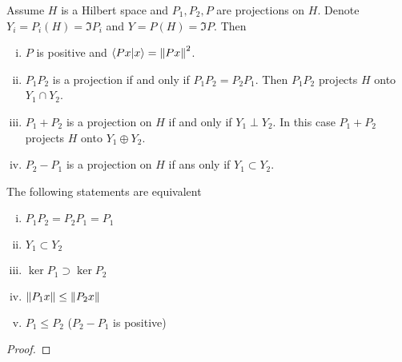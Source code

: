 \documentclass[../../script.tex]{subfiles}
\begin{document}
\begin{defi}
    Assume $H$ is a Hilbert space and $P_1, P_2, P$ are projections on $H$. Denote $Y_i = P_i(H) = \Im P_i$ and $Y = P(H) = \Im P$. Then 
    \begin{enumerate}[(i)]
        \item $P$ is positive and $\innerproduct{Px}{x} = \norm{Px}^2$.
        \item $P_1 P_2$ is a projection if and only if $P_1 P_2 = P_2 P_1$. Then $P_1 P_2$ projects $H$ onto $Y_1 \cap Y_2$.
        \item $P_1 + P_2$ is a projection on $H$ if and only if $Y_1 \perp Y_2$. In this case $P_1 + P_2$ projects $H$ onto $Y_1 \oplus Y_2$.
        \item $P_2 - P_1$ is a projection on $H$ if ans only if $Y_1 \subset Y_2$.
    \end{enumerate}
\end{defi}

\begin{thm}
    The following statements are equivalent
    \begin{enumerate}[(i)]
        \item $P_1 P_2 = P_2 P_1 = P_1$
        \item $Y_1 \subset Y_2$
        \item $\ker P_1 \supset \ker P_2$
        \item $\norm{P_1 x} \le \norm{P_2 x}$
        \item $P_1 \le P_2$ ($P_2 - P_1$ is positive)
    \end{enumerate}
\end{thm}
\begin{proof}
    \noproof
\end{proof}
\end{document}
